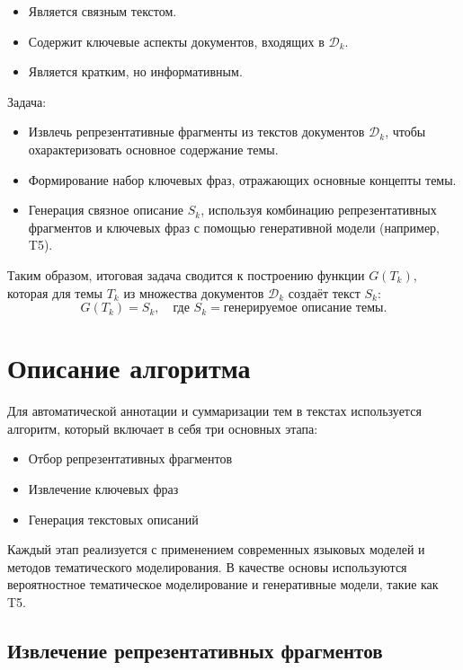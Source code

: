 \documentclass{article}
\begin{document}
\begin{itemize}
    \item Является связным текстом.
    \item Содержит ключевые аспекты документов, входящих в $ \mathcal{D}_k $.
    \item Является кратким, но информативным.
\end{itemize}


Задача:
\begin{itemize}
    \item Извлечь репрезентативные фрагменты из текстов документов $ \mathcal{D}_k $, чтобы охарактеризовать основное содержание темы.
    \item Формирование набор ключевых фраз, отражающих основные концепты темы.
    \item Генерация связное описание $ S_k $, используя комбинацию репрезентативных фрагментов и ключевых фраз с помощью генеративной модели (например, T5).
\end{itemize}

Таким образом, итоговая задача сводится к построению функции $ G(T_k) $, которая для темы $ T_k $ из множества документов $ \mathcal{D}_k $ создаёт текст $ S_k $:
$$
G(T_k) = S_k, \quad \text{где } S_k = \text{генерируемое описание темы}.
$$

\section{Описание алгоритма}

Для автоматической аннотации и суммаризации тем в текстах используется алгоритм, который включает в себя три основных этапа: 
\begin{itemize}
    \item Отбор репрезентативных фрагментов
    \item Извлечение ключевых фраз
    \item Генерация текстовых описаний
\end{itemize} 
Каждый этап реализуется с применением современных языковых моделей и методов тематического моделирования. В качестве основы используются вероятностное тематическое моделирование и генеративные модели, такие как T5.\cite{6ronnqvist2015exploratory}

\subsection{Извлечение репрезентативных фрагментов}
\end{document}
